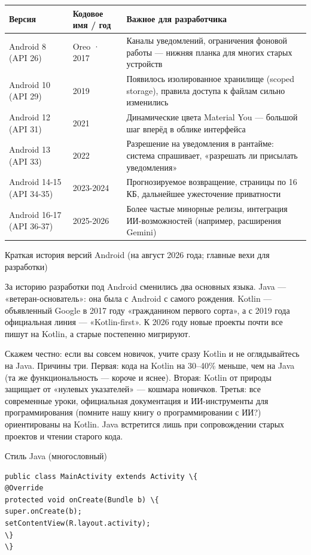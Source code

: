 \begin{center}
\begin{tabularx}{\linewidth}{|X|X|X|}
\hline
\textbf{Версия} & \textbf{Кодовое имя / год} & \textbf{Важное для разработчика} \tabularnewline
\hline
Android 8 (API 26) & Oreo · 2017 & Каналы уведомлений, ограничения фоновой работы — нижняя планка для многих старых устройств \tabularnewline
Android 10 (API 29) & 2019 & Появилось изолированное хранилище (scoped storage), правила доступа к файлам сильно изменились \tabularnewline
Android 12 (API 31) & 2021 & Динамические цвета Material You — большой шаг вперёд в облике интерфейса \tabularnewline
Android 13 (API 33) & 2022 & Разрешение на уведомления в рантайме: система спрашивает, «разрешать ли присылать уведомления» \tabularnewline
Android 14-15 (API 34-35) & 2023-2024 & Прогнозируемое возвращение, страницы по 16 КБ, дальнейшее ужесточение приватности \tabularnewline
Android 16-17 (API 36-37) & 2025-2026 & Более частые минорные релизы, интеграция ИИ-возможностей (например, расширения Gemini) \tabularnewline
\hline
\end{tabularx}
\end{center}

\begin{center}\small\color{gray}Краткая история версий Android (на август 2026 года; главные вехи для разработки)\end{center}


За историю разработки под Android сменились два основных языка. Java — «ветеран-основатель»: она была с Android с самого рождения. Kotlin — объявленный Google в 2017 году «гражданином первого сорта», а с 2019 года официальная линия — «Kotlin-first». К 2026 году новые проекты почти все пишут на Kotlin, а старые постепенно мигрируют.

Скажем честно: если вы совсем новичок, учите сразу Kotlin и не оглядывайтесь на Java. Причины три. Первая: кода на Kotlin на 30–40\% меньше, чем на Java (та же функциональность — короче и яснее). Вторая: Kotlin от природы защищает от «нулевых указателей» — кошмара новичков. Третья: все современные уроки, официальная документация и ИИ-инструменты для программирования (помните нашу книгу о программировании с ИИ?) ориентированы на Kotlin. Java встретится лишь при сопровождении старых проектов и чтении старого кода.

Стиль Java (многословный)

\begin{lstlisting}
public class MainActivity extends Activity \{
@Override
protected void onCreate(Bundle b) \{
super.onCreate(b);
setContentView(R.layout.activity);
\}
\}
\end{lstlisting}

